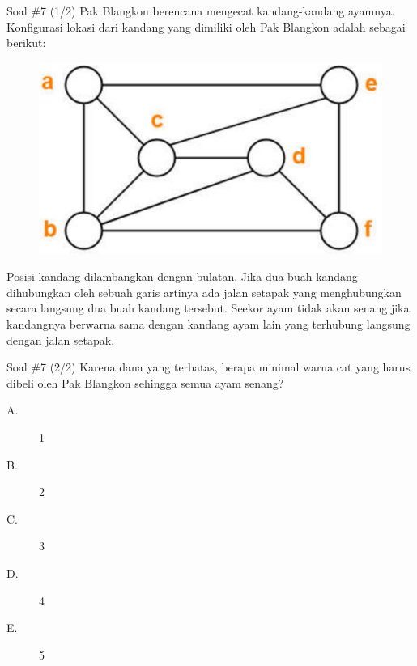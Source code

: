 \documentclass[english,t]{beamer}
\begin{document}
	\begin{frame}{Soal \#7 (1/2)}
		Pak Blangkon berencana mengecat kandang-kandang ayamnya. Konfigurasi lokasi dari kandang yang dimiliki oleh Pak Blangkon adalah sebagai berikut:
		\begin{figure}[!ht]
			\centering
			\includegraphics[scale=.15]{images/map-coloring}
		\end{figure}
		Posisi kandang dilambangkan dengan bulatan. Jika dua buah kandang dihubungkan oleh sebuah garis artinya ada jalan setapak yang menghubungkan secara langsung dua buah kandang tersebut. Seekor ayam tidak akan senang jika kandangnya berwarna sama dengan kandang ayam lain yang terhubung langsung dengan jalan setapak. 		
	\end{frame}

	\begin{frame}{Soal \#7 (2/2)}
		Karena dana yang terbatas, berapa minimal warna cat yang harus dibeli oleh Pak Blangkon sehingga semua ayam senang?
		\begin{description}
			\item[A.] 1
			\item[B.] 2
			\item[C.] 3
			\item[D.] 4
			\item[E.] 5
		\end{description}		
	\end{frame}
\end{document}

